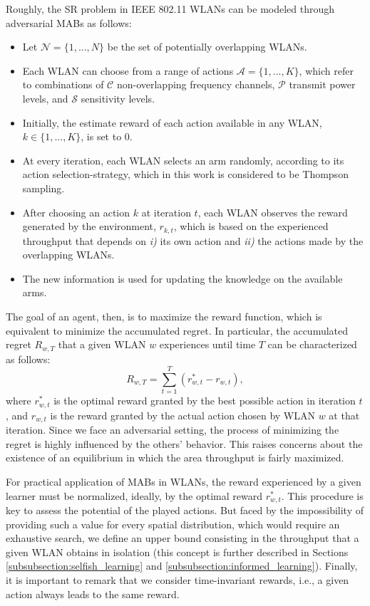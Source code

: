\documentclass{article}
\begin{document}
Roughly, the SR problem in IEEE 802.11 WLANs can be modeled through adversarial MABs as follows:	
\begin{itemize}
	\item Let $\mathcal{N} = \{1,..., N\}$ be the set of potentially overlapping WLANs.
	\item Each WLAN can choose from a range of actions $\mathcal{A} = \{1,..., K\}$, which refer to combinations of $\mathcal{C}$ non-overlapping frequency channels, $\mathcal{P}$ transmit power levels, and $\mathcal{S}$ sensitivity levels.
	\item Initially, the estimate reward of each action available in any WLAN, $k \in \{1,...,K\}$, is set to 0.
	\item At every iteration, each WLAN selects an arm randomly, according to its action selection-strategy, which in this work is considered to be Thompson sampling.
	\item After choosing an action $k$ at iteration $t$, each WLAN observes the reward generated by the environment, $r_{k,t}$, which is based on the experienced throughput that depends on \emph{i)} its own action and \emph{ii)} the actions made by the overlapping WLANs.
	\item The new information is used for updating the knowledge on the available arms.
\end{itemize}

The goal of an agent, then, is to maximize the reward function, which is equivalent to minimize the accumulated regret. In particular, the accumulated regret $R_{w,T}$ that a given WLAN $w$ experiences until time $T$ can be characterized as follows:
\begin{equation}
R_{w,T} = \sum_{t = 1}^{T} (r_{w,t}^* - r_{w,t}),
\nonumber
\end{equation}
where $r_{w,t}^*$ is the optimal reward granted by the best possible action in iteration $t$, and $r_{w,t}$ is the reward granted by the actual action chosen by WLAN $w$ at that iteration. Since we face an adversarial setting, the process of minimizing the regret is highly influenced by the others' behavior. This raises concerns about the existence of an equilibrium in which the area throughput is fairly maximized. 

For practical application of MABs in WLANs, the reward experienced by a given learner must be normalized, ideally, by the optimal reward $r_{w,t}^*$. This procedure is key to assess the potential of the played actions. But faced by the impossibility of providing such a value for every spatial distribution, which would require an exhaustive search, we define an upper bound consisting in the throughput that a given WLAN obtains in isolation (this concept is further described in Sections \ref{subsubsection:selfish_learning} and \ref{subsubsection:informed_learning}). Finally, it is important to remark that we consider time-invariant rewards, i.e., a given action  always leads to the same reward.
\end{document}
